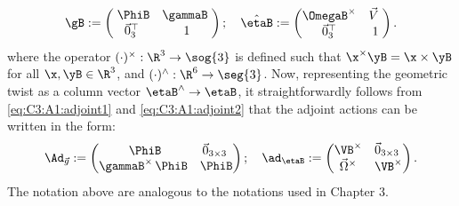 %
\begin{align}
    \gB  := 
    \begin{pmatrix}
    \; {\PhiB} & \gammaB \; \\
    \vec{0}_3^\top & 1
    \end{pmatrix}; \quad
    \hat{\etaB} := 
    \begin{pmatrix}
    \OmegaB^{\times} & \vec{V} \; \\
    \vec{0}_3^\top & 1
    \end{pmatrix}.
\end{align}
%
where the operator $(\cdot)^{\times}:\R^3 \to \sog{3}$ is defined such that $\x^\times\yB = \x \times \yB$ for all $\x,\yB \in \R^3$, and $(\cdot)^\wedge:\R^6 \to \seg{3}$. Now, representing the geometric twist as a column vector $\etaB^\wedge \to \etaB$, it straightforwardly follows from \eqref{eq:C3:A1:adjoint1} and \eqref{eq:C3:A1:adjoint2} that the adjoint actions can be written in the form:
%
\begin{align}
    \Ad_{\vec{g}}  := 
    \begin{pmatrix}
    \; {\PhiB} & \vec{0}_{3\times3} \; \\
    \gammaB^{\times}\,{\PhiB} & {\PhiB}
    \end{pmatrix}; \quad
    \ad_{\etaB}  := 
    \begin{pmatrix}
    \VB^{\times} & \vec{0}_{3\times3} \; \\
    \vec{\Omega}^{\times} & \VB^{\times} 
    \end{pmatrix}.
\end{align}
The notation above are analogous to the notations used in Chapter 3. \\ \vspace{-3mm}

